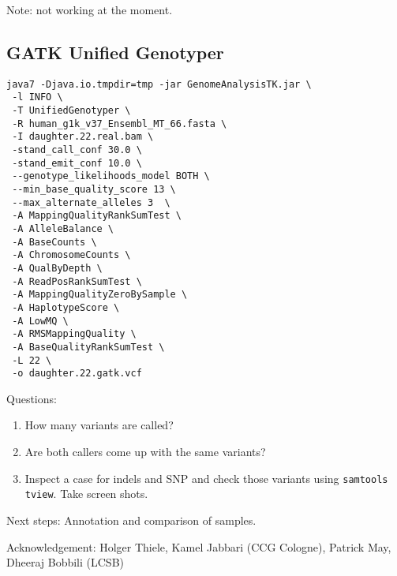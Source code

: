 \documentclass{article}
\begin{document}
Note: not working at the moment. 
\subsection{ GATK Unified Genotyper}
\begin{verbatim}
java7 -Djava.io.tmpdir=tmp -jar GenomeAnalysisTK.jar \
 -l INFO \
 -T UnifiedGenotyper \
 -R human_g1k_v37_Ensembl_MT_66.fasta \
 -I daughter.22.real.bam \
 -stand_call_conf 30.0 \
 -stand_emit_conf 10.0 \
 --genotype_likelihoods_model BOTH \
 --min_base_quality_score 13 \
 --max_alternate_alleles 3  \
 -A MappingQualityRankSumTest \
 -A AlleleBalance \
 -A BaseCounts \
 -A ChromosomeCounts \
 -A QualByDepth \
 -A ReadPosRankSumTest \
 -A MappingQualityZeroBySample \
 -A HaplotypeScore \
 -A LowMQ \
 -A RMSMappingQuality \
 -A BaseQualityRankSumTest \
 -L 22 \
 -o daughter.22.gatk.vcf
\end{verbatim} 

Questions:
\begin{enumerate}
\item How many variants are called?
\item Are both callers come up with the same variants? 
\item Inspect a case for indels and SNP and check those variants using
\verb+samtools tview+. Take screen shots.
\end{enumerate}

Next steps: Annotation and comparison of samples.

Acknowledgement: Holger Thiele, Kamel Jabbari (CCG Cologne), Patrick May, Dheeraj Bobbili (LCSB)
\end{document}
